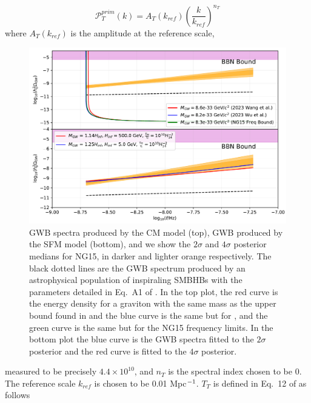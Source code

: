 \documentclass[prd,twocolumn,aps,psfig,nofootinbib,nobibnotes,superscriptaddress,preprintnumbers,times]{revtex4-2}
\begin{document}
\begin{equation}\label{eqn:23}
    \mathcal{P}_{T}^{prim}(k) = A_T(k_{ref})\left(\frac{k}{k_{ref}}\right)^{n_T}
\end{equation}
where $A_T(k_{ref})$ is the amplitude at the reference scale,

\onecolumngrid
\begin{center}
\begin{figure}
\includegraphics[width=\textwidth]{fig/fig8.pdf} 
\caption{GWB spectra produced by the CM model \cite{Gumrukcuoglu:2012} (top), GWB produced by the SFM model \cite{Fujita:2018} (bottom), and we show the $2\sigma$ and $4\sigma$ posterior medians for NG15, in darker and lighter orange respectively. The black dotted lines are the GWB spectrum produced by an astrophysical population of inspiraling SMBHBs with the parameters detailed in Eq.\ A1 of \cite{Afzal:2023}. In the top plot, the red curve is the energy density for a graviton with the same mass as the upper bound found in \cite{Wang:2023} and the blue curve is the same but for \cite{Wu:2023}, and the green curve is the same but for the NG15 frequency limits. In the bottom plot the blue curve is the GWB spectra fitted to the $2\sigma$ posterior and the red curve is fitted to the $4\sigma$ posterior.}
\label{fig:GWB}
\end{figure}
\end{center}
\twocolumngrid 
\hspace{-1em}measured to be precisely $4.4\times 10^{10}$, and $n_T$ is the spectral index chosen to be 0. The reference scale $k_{ref}$ is chosen to be 0.01 Mpc$\/^{-1}$. $T_{T}$ is defined in Eq.\ 12 of \cite{Kuroyanagi:2015} as follows 
\end{document}
